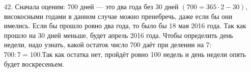 42. Сначала оценим: 700 дней --- это два года без 30 дней $(700=365\cdot2-30),$ високосными годами в данном случае можно пренебречь, даже если бы они имелись. Если бы прошло ровно два года, то было бы 18 мая 2016 года. Так как прошло на 30 дней меньше, будет апрель 2016 года. Чтобы определить день недели, надо узнать, какой остаток число 700 даёт при делении на 7: $700:7=100.$Так как остатка нет, пройдёт ровно 100 недель и день недели опять будет воскресеньем.\\
